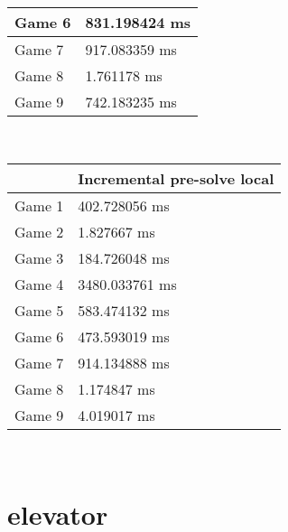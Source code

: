 \begin{multicols}{2}
\begin{tabular}{|l|l|}
	Game 6 & 831.198424 ms \\ \hline
	Game 7 & 917.083359 ms \\ \hline
	Game 8 & 1.761178 ms \\ \hline
	Game 9 & 742.183235 ms \\ \hline
\end{tabular}\\
\begin{tabular}{|l|l|}
	\hline
	& Incremental pre-solve local \\ \hline
	Game 1 & 402.728056 ms \\ \hline
	Game 2 & 1.827667 ms \\ \hline
	Game 3 & 184.726048 ms \\ \hline
	Game 4 & 3480.033761 ms \\ \hline
	Game 5 & 583.474132 ms \\ \hline
	Game 6 & 473.593019 ms \\ \hline
	Game 7 & 914.134888 ms \\ \hline
	Game 8 & 1.174847 ms \\ \hline
	Game 9 & 4.019017 ms \\ \hline
\end{tabular}\\
\end{multicols}\pagebreak\section{elevator}
